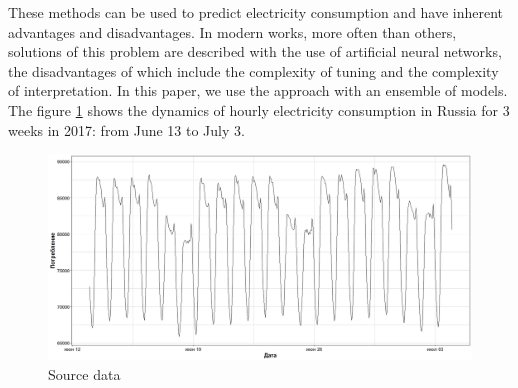 \documentclass[11pt]{article}
\begin{document}
These methods can be used to predict electricity consumption and have inherent
advantages and disadvantages. In modern works, more often than others, solutions
of this problem are described with the use of artificial neural networks, the
disadvantages of which include the complexity of tuning and the complexity of
interpretation. In this paper, we use the approach with an ensemble of models.
The figure \ref{fig:data} shows the dynamics of hourly electricity consumption
in Russia for 3 weeks in 2017: from June 13 to July 3.
\begin{figure}
  \centering
  \includegraphics[width=0.6\linewidth]{train_dataset.jpeg}
  \caption{Source data}
  \label{fig:data}
\end{figure}
\end{document}
